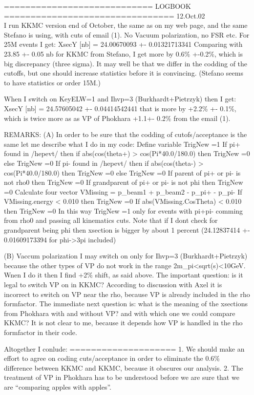 ============================ LOGBOOK ================================
12.Oct.02\\
I run KKMC version end of October, the same as on my web page,
and the same Stefano is using,  with cuts of email (1).
No Vacuum polarization, no FSR etc.
For 25M events I get:
     XsecY [nb] = 24.00670093 +- 0.01321713341
Comparing with 23.85 +- 0.05 nb for KKMC from Stefano,
I get more by 0.6\% +-0.2\%, which is big discrepancy (three sigma).
It may well be that we differ in the codding of the cutoffs,
but one should increase statistics before it is convincing.
(Stefano seems to have statistics or order 15M.)

When I switch on KeyELW=1 and Ihvp=3 (Burkhardt+Pietrzyk) then I get:
     XsecY [nb] = 24.57605042 +- 0.04414542441
that is more by +2.2\% +- 0.1\%, which is twice more as
as VP of Phokhara +1.1+- 0.2\% from the email (1).

REMARKS:
(A) In order to be sure that the codding of cutofs/acceptance 
is the same let me describe what I do in my code:
 Define variable TrigNew =1
 If pi+ found in /hepevt/ then
   if abs(cos(theta+) > cos(Pi*40.0/180.0) then TrigNew =0
 else TrigNew =0
 If pi- found in /hepevt/ then
   if abs(cos(theta-) > cos(Pi*40.0/180.0) then TrigNew =0
 else TrigNew =0
 If parent of pi+ or pi-       is not rho0 then  TrigNew =0
 If grandparent of pi+ or pi-  is not phi  then  TrigNew =0
 Calculate four vector VMissing = p_beam1 + p_beam2 - p_pi+ - p_pi-
 If VMissing.energy < 0.010         then TrigNew =0
 If abs(VMissing.CosTheta) < 0.010  then TrigNew =0
In this way TrigNew =1 only for events with pi+pi- comming from rho0
and passing all kinematics cuts.
Note that if I dont check for grandparent being phi then
xsection is bigger by about 1 percent
    (24.12837414 +- 0.01609173394 for phi->3pi included)

(B) Vaccum polarization I may switch on only for Ihvp=3
(Burkhardt+Pietrzyk) because the other types of VP do not work 
in the range 2m_pi<sqrt(s)<10GeV.
Wnen I do it then I find +2\% shift, as said above.
The important question: is it legal to switch VP on in KKMC?
According to discussion with Axel it is incorrect to switch on VP
near the rho, because VP is already included in the rho formfactor.
The immediate next question is: what is the meaning of the xsections
from Phokhara with and without VP?
and with which one we could compare KKMC? 
It is not clear to me, because it depends how VP is handled in the
rho formfactor in their code.

Altogether I conlude:
====================
1. We should make an effort to agree on coding cuts/acceptance in order to
eliminate the 0.6\% difference between KKMC and KKMC,
because it obscures our analysis.
2. The treatment of VP in Phokhara has to be understood before we
are sure that we are ``comparing apples with apples''.


